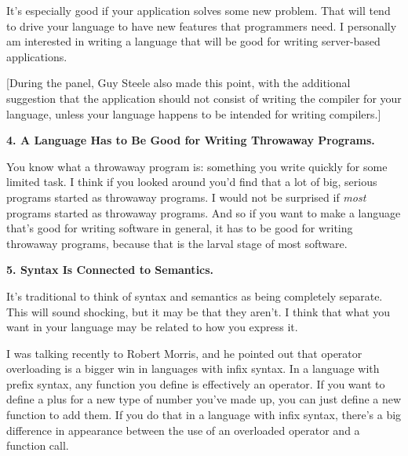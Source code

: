 It's especially good if your application
                    solves some new problem. That will tend to drive your
                    language to have new features that programmers need. I
                    personally am interested in writing a language that will be
                    good for writing server-based applications.

[During
                    the panel, Guy Steele also made this point, with the
                    additional suggestion that the application should not
                    consist of writing the compiler for your language, unless
                    your language happens to be intended for writing
                    compilers.]

\textbf{4. A Language Has to Be Good for Writing Throwaway
                      Programs.}

You know what a throwaway program is: something
                    you write quickly for some limited task. I think if you
                    looked around you'd find that a lot of big, serious programs
                    started as throwaway programs. I would not be surprised if
                    \emph{most} programs started as throwaway programs. And so
                    if you want to make a language that's good for writing
                    software in general, it has to be good for writing throwaway
                    programs, because that is the larval stage of most
                    software.

\textbf{5. Syntax Is Connected to Semantics.}

It's traditional to think of syntax and
                    semantics as being completely separate. This will sound
                    shocking, but it may be that they aren't. I think that what
                    you want in your language may be related to how you express
                    it.

I was talking recently to Robert Morris, and
                    he pointed out that operator overloading is a bigger win in
                    languages with infix syntax. In a language with prefix
                    syntax, any function you define is effectively an operator.
                    If you want to define a plus for a new type of number you've
                    made up, you can just define a new function to add them. If
                    you do that in a language with infix syntax, there's a big
                    difference in appearance between the use of an overloaded
                    operator and a function call.





